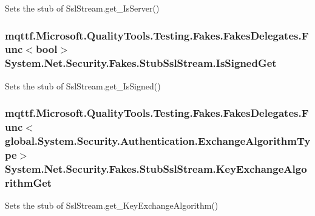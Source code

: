 Sets the stub of Ssl\-Stream.\-get\-\_\-\-Is\-Server()

\hypertarget{class_system_1_1_net_1_1_security_1_1_fakes_1_1_stub_ssl_stream_ae2cb55037dfc0b9f36305f71923008a3}{
\subsubsection[{Is\-Signed\-Get}]{\setlength{\rightskip}{0pt plus 5cm}mqttf.\-Microsoft.\-Quality\-Tools.\-Testing.\-Fakes.\-Fakes\-Delegates.\-Func$<$bool$>$ System.\-Net.\-Security.\-Fakes.\-Stub\-Ssl\-Stream.\-Is\-Signed\-Get}}\label{class_system_1_1_net_1_1_security_1_1_fakes_1_1_stub_ssl_stream_ae2cb55037dfc0b9f36305f71923008a3}


Sets the stub of Ssl\-Stream.\-get\-\_\-\-Is\-Signed()

\hypertarget{class_system_1_1_net_1_1_security_1_1_fakes_1_1_stub_ssl_stream_a0729e4f63cd37e4c426b5bdc44c93950}{
\subsubsection[{Key\-Exchange\-Algorithm\-Get}]{\setlength{\rightskip}{0pt plus 5cm}mqttf.\-Microsoft.\-Quality\-Tools.\-Testing.\-Fakes.\-Fakes\-Delegates.\-Func$<$global.\-System.\-Security.\-Authentication.\-Exchange\-Algorithm\-Type$>$ System.\-Net.\-Security.\-Fakes.\-Stub\-Ssl\-Stream.\-Key\-Exchange\-Algorithm\-Get}}\label{class_system_1_1_net_1_1_security_1_1_fakes_1_1_stub_ssl_stream_a0729e4f63cd37e4c426b5bdc44c93950}


Sets the stub of Ssl\-Stream.\-get\-\_\-\-Key\-Exchange\-Algorithm()

